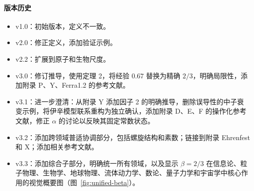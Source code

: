 \documentclass[12pt]{article}
\begin{document}
	\paragraph*{版本历史}
	\begin{itemize}
		\item v1.0：初始版本，定义不一致。
		\item v2.0：修正定义，添加验证示例。
		\item v2.2：扩展到原子和生物尺度。
		\item v3.0：修订推导，使用定理 2，将经验 \(0.67\) 替换为精确 \(2/3\)，明确局限性，添加附录 P、Y、Ferra1.2 的参考文献。
		\item v3.1：进一步澄清：从附录 Y 添加因子 2 的明确推导，删除误导性的中子衰变示例，将伊辛模型联系重构为独立确认，添加附录 D、E、F 的操作化参考文献，修正 \(\alpha\) 的讨论以反映其固定常数状态。
		\item v3.2：添加跨领域普适协调部分，包括螺旋结构和素数；链接到附录 Ehrenfest 和 X；添加相关参考文献。
		\item v3.3：添加综合子部分，明确统一所有领域，以及显示 \(\beta = 2/3\) 在信息论、粒子物理、生物学、地球物理、流体动力学、数论、量子力学和宇宙学中核心作用的视觉概要图（图~\ref{fig:unified-beta}）。
	\end{itemize}
	
\end{document}
